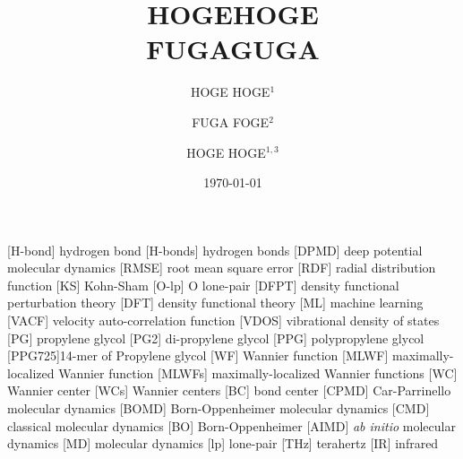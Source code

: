 \documentclass[luatex,twocolumn,showpacs,aps,prb,reprint,amsfonts,amsmath,amssymb,floatfix,groupedaddress, longbibliography]{revtex4-2}
\begin{document}
\title{HOGEHOGE \\
FUGAGUGA}

\author{HOGE HOGE$^{1}$ }
\author{FUGA FOGE$^{2}$ }
\author{HOGE HOGE$^{1,3}$ }

\date{\today}


\onecolumngrid

\begin{abstract}
 \lipsum[1-1]
\end{abstract}

\twocolumngrid


\maketitle



 \begin{acronym}[PPG725]
  \setlength{\itemsep}{4.0pt}
     [H-bond] {hydrogen bond} 
     [H-bonds] {hydrogen bonds} %
       [DPMD]   {deep potential molecular dynamics}
       [RMSE]   {root mean square error}
        [RDF]    {radial distribution function}
         [KS]    {Kohn-Sham} %
       [O-lp]  {O lone-pair} %
       [DFPT]  {density functional perturbation theory} %
        [DFT]   {density functional theory}
         [ML]    {machine learning}
       [VACF]  {velocity auto-correlation function}
       [VDOS]  {vibrational density of states}
         [PG]    {propylene glycol}
        [PG2]   {di-propylene glycol}
        [PPG]   {polypropylene glycol}
     [PPG725]{14-mer of Propylene glycol }
         [WF]    {Wannier function}
       [MLWF]  {maximally-localized Wannier function}
      [MLWFs]  {maximally-localized Wannier functions}
         [WC]    {Wannier center}
      [WCs]  {Wannier centers}
         [BC]    {bond center}
       [CPMD]  {Car-Parrinello molecular dynamics}
       [BOMD]  {Born-Oppenheimer molecular dynamics}
        [CMD]  {classical molecular dynamics}
         [BO]    {Born-Oppenheimer}
       [AIMD]  {\textit{ab initio} molecular dynamics}
         [MD]    {molecular dynamics}
         [lp]    {lone-pair}   
        [THz]    {terahertz}
         [IR]     {infrared}

 \end{acronym}
\end{document}
